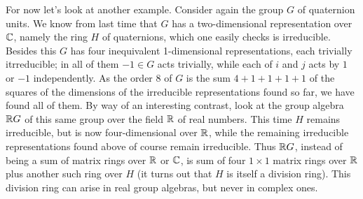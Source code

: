 For now let's look at another example.  Consider again the group $G$ of quaternion units.  We know from last time that $G$ has a two-dimensional representation over $\Bbb C$, namely the ring $H$ of quaternions, which one easily checks is irreducible.  Besides this $G$ has four inequivalent 1-dimensional representations, each trivially itrreducible; in all of them $-1\in G$ acts trivially, while each of $i$ and $j$ acts by $1$ or $-1$ independently.  As the order 8 of $G$ is the sum $4+1+1+1+1$ of the squares of the dimensions of the irreducible representations found so far, we have found all of them.  By way of an interesting contrast, look at the group algebra $\Bbb RG$ of this same group over the field $\Bbb R$ of real numbers.  This time $H$ remains irreducible, but is now four-dimensional over $\Bbb R$, while the remaining irreducible representations found above of course remain irreducible.  Thus $\Bbb RG$, instead of being a sum of matrix rings over $\Bbb R$ or $\Bbb C$, is sum of four $1\times 1$ matrix rings over $\Bbb R$ plus another such ring over $H$ (it turns out that $H$ is itself a division ring).  This division ring can arise in real group algebras, but never in complex ones.